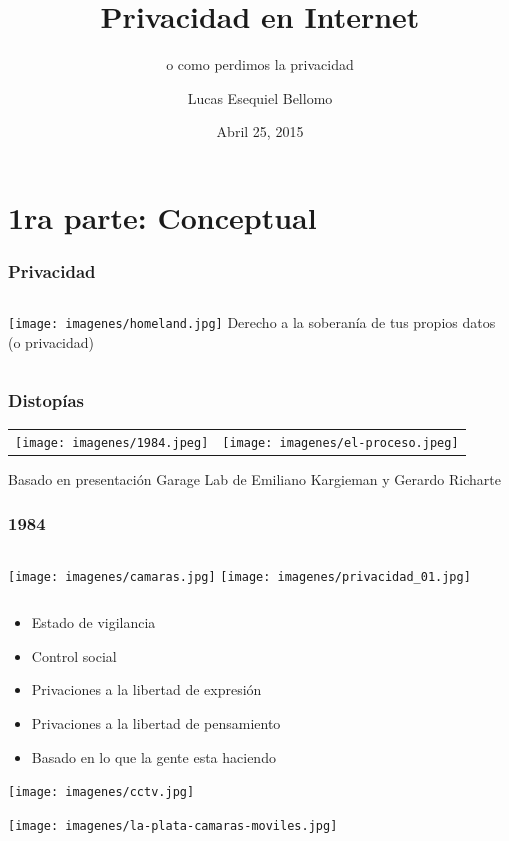 \documentclass{beamer}
\title{Privacidad en Internet}
\subtitle{o como perdimos la privacidad}
\author{Lucas Esequiel Bellomo}
\institute{FLISoL Río Cuarto}
\date{Abril 25, 2015}
\begin{document}
\begin{frame}
  \titlepage
\end{frame}

\section{1ra parte: Conceptual}

\begin{frame}
  \frametitle{Privacidad}
  \begin{columns}
    \texttt{[image: imagenes/homeland.jpg]}
     Derecho a la soberanía de tus propios datos (o privacidad)
  \end{columns}
\end{frame}

\begin{frame}
  \frametitle{Distopías}
  \begin{tabular}{cc}
     \texttt{[image: imagenes/1984.jpeg]} & \pause \texttt{[image: imagenes/el-proceso.jpeg]}
     \end{tabular}
     Basado en presentación Garage Lab de Emiliano Kargieman y Gerardo Richarte
  \end{frame}

\begin{frame}
  \frametitle{1984}
  \begin{columns}
    \texttt{[image: imagenes/camaras.jpg]}
    \texttt{[image: imagenes/privacidad\_01.jpg]}
    \end{columns}
  \begin{itemize}
  \item Estado de vigilancia \pause
  \item Control social \pause
  \item Privaciones a la libertad de expresión \pause
  \item Privaciones a la libertad de pensamiento \pause
  \item Basado en lo que la gente esta haciendo
  \end{itemize}
\end{frame}

\begin{frame}
  \texttt{[image: imagenes/cctv.jpg]}
\end{frame}


\begin{frame}
   \texttt{[image: imagenes/la-plata-camaras-moviles.jpg]}
\end{frame}
\end{document}
